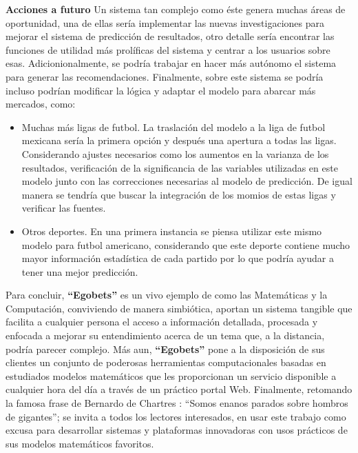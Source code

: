 \textbf{Acciones a futuro}
Un sistema tan complejo como éste genera muchas áreas de oportunidad, una de ellas sería implementar las nuevas investigaciones para mejorar el sistema de predicción de resultados, otro detalle sería encontrar las funciones de utilidad más prolíficas del sistema y centrar a los usuarios sobre esas. Adicionionalmente, se podría trabajar en hacer más autónomo el sistema para generar las recomendaciones. Finalmente, sobre este sistema se podría incluso podrían modificar la lógica y adaptar el modelo para abarcar más mercados, como:
\begin{itemize}

	\item Muchas más ligas de futbol. La traslación del modelo a la liga de futbol mexicana sería la primera opción y después una apertura a todas las ligas. Considerando ajustes necesarios como los aumentos en la varianza de los resultados, verificación de la significancia de las variables utilizadas en este modelo junto con las correcciones necesarias al modelo de predicción. De igual manera se tendría que buscar la integración de los momios de estas ligas y verificar las fuentes.

	\item Otros deportes. En una primera instancia se piensa utilizar este mismo modelo para futbol americano, considerando que este deporte contiene mucho mayor información estadística de cada partido por lo que podría ayudar a tener una mejor predicción.

\end{itemize}

	
Para concluir, \textbf{``Egobets''} es un vivo ejemplo de como las Matemáticas y la Computación, conviviendo de manera simbiótica, aportan un sistema tangible que facilita a cualquier persona el acceso a información detallada, procesada y enfocada a mejorar su entendimiento acerca de un tema que, a la distancia, podría parecer complejo. Más aun, \textbf{``Egobets''} pone a la disposición de sus clientes un conjunto de poderosas herramientas computacionales basadas en estudiados modelos matemáticos que les proporcionan un servicio disponible a cualquier hora del día a través de un práctico portal Web. Finalmente, retomando la famosa frase de Bernardo de Chartres \cite{john1962metalogicon}: ``Somos enanos parados sobre hombros de gigantes''; se invita a todos los lectores interesados, en usar este trabajo como excusa para desarrollar sistemas y plataformas innovadoras con usos prácticos de sus modelos matemáticos favoritos.
























